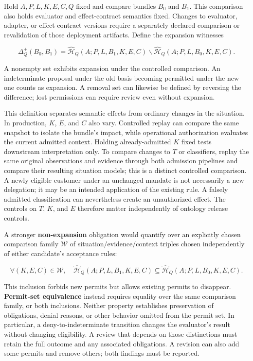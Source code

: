 \documentclass[
  english,
  12pt,
  a4paper,
  preprint,
  numbers,
  nopreprintline]{elsarticle}
\newcounter{none} %
\begin{document}
Hold \(A,P,L,K,E,C,Q\) fixed and compare bundles \(B_0\) and \(B_1\).
This comparison also holds evaluator and effect-contract semantics
fixed. Changes to evaluator, adapter, or effect-contract versions
require a separately declared comparison or revalidation of those
deployment artifacts. Define the expansion witnesses

\[ \Delta^+_Q(B_0,B_1)
= \widehat{\mathcal{H}}_Q(A;P,L,B_1,K,E,C)
\smallsetminus \widehat{\mathcal{H}}_Q(A;P,L,B_0,K,E,C). \]

A nonempty set exhibits expansion under the controlled comparison. An
indeterminate proposal under the old basis becoming permitted under the
new one counts as expansion. A removal set can likewise be defined by
reversing the difference; lost permissions can require review even
without expansion.

This definition separates semantic effects from ordinary changes in the
situation. In production, \(K\), \(E\), and \(C\) also vary. Controlled
replay can compare the same snapshot to isolate the bundle's impact,
while operational authorization evaluates the current admitted context.
Holding already-admitted \(K\) fixed tests downstream interpretation
only. To compare changes to \(T\) or classifiers, replay the same
original observations and evidence through both admission pipelines and
compare their resulting situation models; this is a distinct controlled
comparison. A newly eligible customer under an unchanged mandate is not
necessarily a new delegation; it may be an intended application of the
existing rule. A falsely admitted classification can nevertheless create
an unauthorized effect. The controls on \(T\), \(K\), and \(E\)
therefore matter independently of ontology release controls.

A stronger \textbf{non-expansion} obligation would quantify over an
explicitly chosen comparison family \(\mathcal{W}\) of
situation/evidence/context triples chosen independently of either
candidate's acceptance rules:

\[ \forall(K,E,C)\in\mathcal{W},\quad
\widehat{\mathcal{H}}_Q(A;P,L,B_1,K,E,C)
\subseteq\widehat{\mathcal{H}}_Q(A;P,L,B_0,K,E,C). \]

This inclusion forbids new permits but allows existing permits to
disappear. \textbf{Permit-set equivalence} instead requires equality
over the same comparison family, or both inclusions. Neither property
establishes preservation of obligations, denial reasons, or other
behavior omitted from the permit set. In particular, a
deny-to-indeterminate transition changes the evaluator's result without
changing eligibility. A review that depends on those distinctions must
retain the full outcome and any associated obligations. A revision can
also add some permits and remove others; both findings must be reported.
\end{document}
